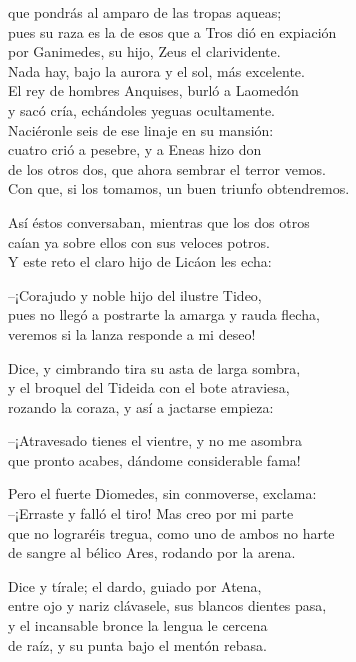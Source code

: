 que pondrás al amparo de las tropas aqueas;\\
pues su raza es la de esos que a Tros dió en expiación\\
por Ganimedes, su hijo, Zeus el clarividente.\\
Nada hay, bajo la aurora y el sol, más excelente.\\
El rey de hombres Anquises, burló a Laomedón\\
y sacó cría, echándoles yeguas ocultamente.\\
Naciéronle seis de ese linaje en su mansión:\\
cuatro crió a pesebre, y a Eneas hizo don\\
de los otros dos, que ahora sembrar el terror vemos.\\
Con que, si los tomamos, un buen triunfo obtendremos.\par
Así éstos conversaban, mientras que los dos otros\\
caían ya sobre ellos con sus veloces potros.\\
Y este reto el claro hijo de Licáon les echa:\par
--¡Corajudo y noble hijo del ilustre Tideo,\\
pues no llegó a postrarte la amarga y rauda flecha,\\
veremos si la lanza responde a mi deseo!\par
Dice, y cimbrando tira su asta de larga sombra,\\
y el broquel del Tideida con el bote atraviesa,\\
rozando la coraza, y así a jactarse empieza:\par
--¡Atravesado tienes el vientre, y no me asombra\\
que pronto acabes, dándome considerable fama!\par
Pero el fuerte Diomedes, sin conmoverse, exclama:\\
--¡Erraste y falló el tiro! Mas creo por mi parte\\
que no lograréis tregua, como uno de ambos no harte\\
de sangre al bélico Ares, rodando por la arena.\par
Dice y tírale; el dardo, guiado por Atena,\\
entre ojo y nariz clávasele, sus blancos dientes pasa,\\
y el incansable bronce la lengua le cercena\\
de raíz, y su punta bajo el mentón rebasa.\\

